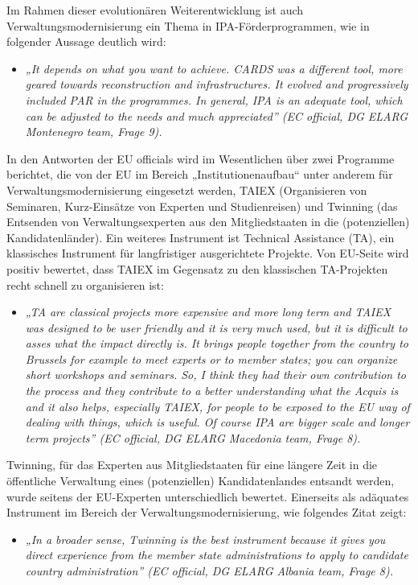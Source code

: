 Im Rahmen dieser evolutionären Weiterentwicklung ist auch Verwaltungsmodernisierung ein Thema in IPA-Förderprogrammen, wie in folgender Aussage deutlich wird:
\begin{itemize}[label={}]
\item \textit{„It depends on what you want to achieve. CARDS was a different tool, more geared towards reconstruction and infrastructures. It evolved and progressively included PAR in the programmes. In general, IPA is an adequate tool, which can be adjusted to the needs and much appreciated” (EC official, DG ELARG Montenegro team, Frage 9).}
\end{itemize}
In den Antworten der EU officials wird im Wesentlichen über zwei Programme berichtet, die von der EU im Bereich „Institutionenaufbau“ unter anderem für Verwaltungsmodernisierung eingesetzt werden, TAIEX (Organisieren von Seminaren, Kurz-Einsätze von Experten und Studienreisen) und Twinning (das Entsenden von Verwaltungsexperten aus den Mitgliedstaaten in die (potenziellen) Kandidatenländer). Ein weiteres Instrument ist Technical Assistance (TA), ein klassisches Instrument für langfristiger ausgerichtete Projekte. Von EU-Seite wird positiv bewertet, dass TAIEX im Gegensatz zu den klassischen TA-Projekten recht schnell zu organisieren ist:
\begin{itemize}[label={}]
\item \textit{„TA are classical projects more expensive and more long term and TAIEX was designed to be user friendly and it is very much used, but it is difficult to asses what the impact directly is. It brings people together from the country to Brussels for example to meet experts or to member states; you can organize short workshops and seminars. So, I think they had their own contribution to the process and they contribute to a better understanding what the Acquis is and it also helps, especially TAIEX, for people to be exposed to the EU way of dealing with things, which is useful. Of course IPA are bigger scale and longer term projects” (EC official, DG ELARG Macedonia team, Frage 8).}
\end{itemize}
Twinning, für das Experten aus Mitgliedstaaten für eine längere Zeit in die öffentliche Verwaltung eines (potenziellen) Kandidatenlandes entsandt werden, wurde seitens der EU-Experten unterschiedlich bewertet. Einerseits als adäquates Instrument im Bereich der Verwaltungsmodernisierung, wie folgendes Zitat zeigt:
\begin{itemize}[label={}]
\item \textit{„In a broader sense, Twinning is the best instrument because it gives you direct experience from the member state administrations to apply to candidate country administration” (EC official, DG ELARG Albania team, Frage 8). }
\end{itemize}


